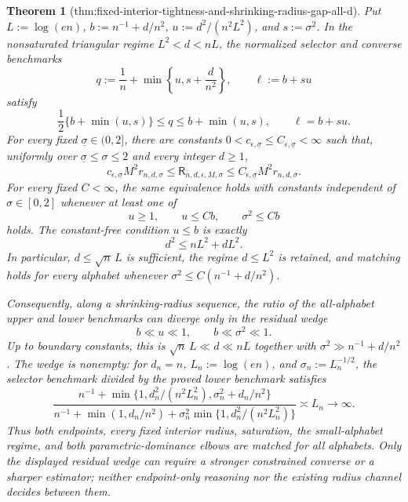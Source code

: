 \documentclass{article}
\newtheorem{theorem}{Theorem}
\begin{document}
\begin{theorem}[thm:fixed-interior-tightness-and-shrinking-radius-gap-all-d]\label{thm:fixed-interior-tightness-and-shrinking-radius-gap-all-d}
Put \(L:=\log(en)\), \(b:=n^{-1}+d/n^2\), \(u:=d^2/(n^2L^2)\), and \(s:=\sigma^2\).  In the nonsaturated triangular regime \(L^2<d<nL\), the normalized selector and converse benchmarks
\[
 q:=\frac1n+\min\left\{u,s+\frac d{n^2}\right\},
 \qquad
 \ell:=b+su
\]
satisfy
\[
 \frac12\{b+\min(u,s)\}\le q\le b+\min(u,s),
 \qquad \ell=b+su.
\]
For every fixed \(\underline\sigma\in(0,2]\), there are constants \(0<c_{\epsilon,\underline\sigma}\le C_{\epsilon,\underline\sigma}<\infty\) such that, uniformly over \(\underline\sigma\le\sigma\le2\) and every integer \(d\ge1\),
\[
 c_{\epsilon,\underline\sigma}M^2r_{n,d,\sigma}
 \le \mathsf R_{n,d,\epsilon,M,\sigma}
 \le C_{\epsilon,\underline\sigma}M^2r_{n,d,\sigma}.
\]
For every fixed \(C<\infty\), the same equivalence holds with constants independent of \(\sigma\in[0,2]\) whenever at least one of
\[
 u\ge1,
 \qquad u\le Cb,
 \qquad \sigma^2\le Cb
\]
holds.  The constant-free condition \(u\le b\) is exactly
\[
 d^2\le nL^2+dL^2.
\]
In particular, \(d\le\sqrt n\,L\) is sufficient, the regime \(d\le L^2\) is retained, and matching holds for every alphabet whenever \(\sigma^2\le C(n^{-1}+d/n^2)\).

Consequently, along a shrinking-radius sequence, the ratio of the all-alphabet upper and lower benchmarks can diverge only in the residual wedge
\[
 b\ll u\ll1,
 \qquad
 b\ll\sigma^2\ll1.
\]
Up to boundary constants, this is \(\sqrt n\,L\ll d\ll nL\) together with \(\sigma^2\gg n^{-1}+d/n^2\).  The wedge is nonempty: for \(d_n=n\), \(L_n:=\log(en)\), and \(\sigma_n:=L_n^{-1/2}\), the selector benchmark divided by the proved lower benchmark satisfies
\[
 \frac{n^{-1}+\min\{1,d_n^2/(n^2L_n^2),\sigma_n^2+d_n/n^2\}}
 {n^{-1}+\min(1,d_n/n^2)+\sigma_n^2\min\{1,d_n^2/(n^2L_n^2)\}}
 \asymp L_n\longrightarrow\infty.
\]
Thus both endpoints, every fixed interior radius, saturation, the small-alphabet regime, and both parametric-dominance elbows are matched for all alphabets.  Only the displayed residual wedge can require a stronger constrained converse or a sharper estimator; neither endpoint-only reasoning nor the existing radius channel decides between them.
\end{theorem}
\end{document}
